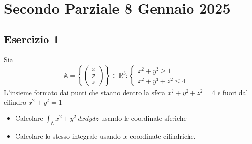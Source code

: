 \documentclass[a4paper, oneside]{book}
\begin{document}
\chapter{Secondo Parziale 8 Gennaio 2025}
\section{Esercizio 1}
Sia 
\begin{gather*}
    \mathbb{A} = \left\{\begin{pmatrix} x\\
    y\\
    z \end{pmatrix} \right\} \in \mathbb{R}^{3} :
    \left\{\begin{array}{l}
        x^{2} + y^{2} \geq 1 \\
        x^{2} + y^{2} + z^{2} \leq 4 
    \end{array}\right.
\end{gather*}
L'insieme formato dai punti che stanno dentro la sfera 
$x^{2} + y^{2} + z^{2} = 4$ e fuori dal cilindro $x^{2} + y^{2} = 1$.
\begin{itemize}
    \item[(a)] Calcolare $\int_{\mathbb{A}} x^{2} + y^{2} \ dx dy dz$ usando le coordinate sferiche
    \item[(b)] Calcolare lo stesso integrale usando le coordinate cilindriche.
\end{itemize}
\end{document}
